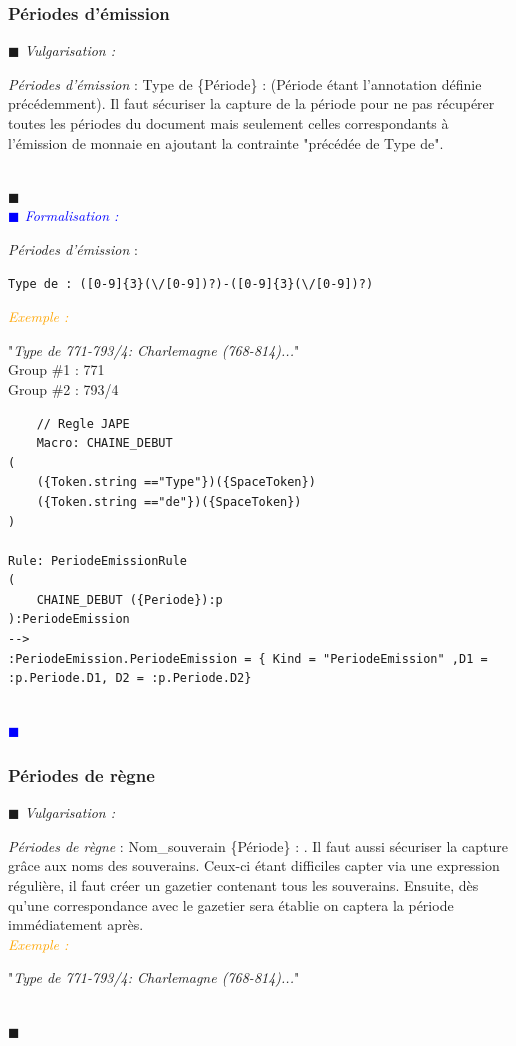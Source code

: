 \documentclass[a4paper, 11pt]{book}
\newenvironment{vulgarisation}
    {
    \textit{\textcolor{dark-blue}{$\blacksquare$  Vulgarisation : \\}}

    }
    {
    ~\\\textcolor{dark-blue}{$\blacksquare$}\\
    }
\newenvironment{formalisation}
    {
    \textit{\textcolor{blue}{$\blacksquare$  Formalisation : \\}}
    }
    {
    ~\\\textcolor{blue}{$\blacksquare$}\\
    }
\newenvironment{exemple}
    {
    \textit{\textcolor{orange}{
    Exemple : \\}}
    }
    {\\
    }
\begin{document}
\subsubsection{Périodes d'émission}
\begin{vulgarisation}
	\textit{Périodes d'émission} : \og Type de \{Période\} : \fg{} (Période étant l'annotation définie précédemment).
	Il faut sécuriser la capture de la période pour ne pas récupérer toutes les périodes du document mais seulement celles correspondants à l’émission de monnaie en ajoutant la contrainte "précédée de Type de".
\end{vulgarisation}
\begin{formalisation}
	\textit{Périodes d'émission} : 
	\begin{verbatim}
Type de : ([0-9]{3}(\/[0-9])?)-([0-9]{3}(\/[0-9])?)
	\end{verbatim}
	\begin{exemple}
		"\emph{Type de 771-793/4: Charlemagne (768-814)...}" \\
		Group \#1 : 771 \\
		Group \#2 : 793/4
	\end{exemple}
		\begin{lstlisting}
	// Regle JAPE
	Macro: CHAINE_DEBUT
(
    ({Token.string =="Type"})({SpaceToken})
    ({Token.string =="de"})({SpaceToken})
)

Rule: PeriodeEmissionRule
(
    CHAINE_DEBUT ({Periode}):p
):PeriodeEmission
-->
:PeriodeEmission.PeriodeEmission = { Kind = "PeriodeEmission" ,D1 = :p.Periode.D1, D2 = :p.Periode.D2}
	\end{lstlisting}
\end{formalisation}

\subsubsection{Périodes de règne}
\begin{vulgarisation}
	\textit{Périodes de règne} : \og Nom\_souverain \{Période\} : \fg{}. Il faut aussi sécuriser la capture grâce aux noms des souverains. Ceux-ci étant difficiles capter via une expression régulière, il faut créer un gazetier contenant tous les souverains. Ensuite, dès qu'une correspondance avec le gazetier sera établie on captera la période immédiatement après.\\
	\begin{exemple}
		"\emph{Type de 771-793/4: Charlemagne (768-814)...}" 
	\end{exemple}
\end{vulgarisation}
\end{document}
